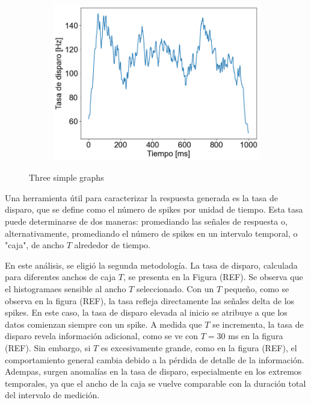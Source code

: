 \documentclass[aps,prb,twocolumn,superscriptaddress,floatfix,longbibliography]{revtex4-2}
\newcounter{para}
\begin{document}
\begin{figure}
\begin{subfigure}[b]{0.3\textwidth}
  \end{subfigure}
  \hfill
  \begin{subfigure}[b]{0.3\textwidth}
      \centering
      \includegraphics[width=\textwidth]{tasa_de_disparo_1000.png}
      \caption{\label{fig:tasa_de_disparo_1000}}
  \end{subfigure}
     \caption{Three simple graphs}
     \label{fig:tasa_de_disparo}
\end{figure}


Una herramienta útil para caracterizar la respuesta generada es la tasa de disparo, que se define como el número de spikes por unidad de tiempo. Esta tasa puede determinarse de dos maneras: promediando las señales de respuesta o, alternativamente, promediando el número de spikes en un intervalo temporal, o "caja", de ancho \(T\) alrededor de tiempo.

En este análisis, se eligió la segunda metodología. La tasa de disparo, calculada para diferentes anchos de caja \(T\), se presenta en la Figura (REF). Se observa que el histogramaes sensible al ancho \(T\) seleccionado. Con un \(T\) pequeño, como se observa en la figura (REF), la tasa refleja directamente las señales delta de los spikes. En este caso, la tasa de disparo elevada al inicio se atribuye a que los datos comienzan siempre con un spike. A medida que \(T\) se incrementa, la tasa de disparo revela información adicional, como se ve con \(T = 30\) ms en la figura (REF). Sin embargo, si \(T\) es excesivamente grande, como en la figura (REF), el comportamiento general cambia debido a la pérdida de detalle de la información. Adempas, surgen anomalías en la tasa de disparo, especialmente en los extremos temporales, 
ya que el ancho de la caja se vuelve comparable con la duración total del intervalo de medición.
\end{document}
